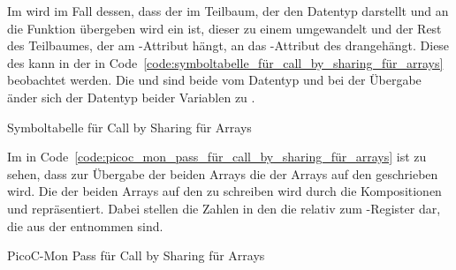 Im  wird im Fall dessen, dass der  im Teilbaum, der den Datentyp darstellt und an die Funktion übergeben wird ein   ist, dieser zu einem   umgewandelt und der Rest des Teilbaumes, der am -Attribut hängt, an das -Attribut des   drangehängt. Diese  des  kann in der  in Code~\ref{code:symboltabelle_für_call_by_sharing_für_arrays} beobachtet werden. Die   und  sind beide vom Datentyp  und bei der Übergabe änder sich der Datentyp beider Variablen zu .

\begin{code}
  \centering
  \caption{Symboltabelle für Call by Sharing für Arrays}
  \label{code:symboltabelle_für_call_by_sharing_für_arrays}
\end{code}

Im  in Code~\ref{code:picoc_mon_pass_für_call_by_sharing_für_arrays} ist zu sehen, dass zur Übergabe der beiden Arrays die  der Arrays auf den  geschrieben wird. Die  der beiden Arrays auf den  zu schreiben wird durch die Kompositionen  und  repräsentiert. Dabei stellen die Zahlen in den   die  relativ zum -Register dar, die aus der  entnommen sind.

\begin{code}
  \centering
  \caption{PicoC-Mon Pass für Call by Sharing für Arrays}
  \label{code:picoc_mon_pass_für_call_by_sharing_für_arrays}
\end{code}

